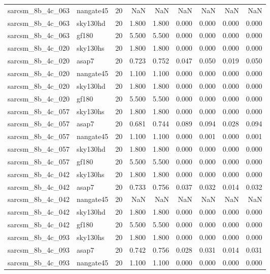 \begin{tabular}{llrrrrrrr}
sarcsm\_8b\_4c\_063 & nangate45 & 20 & NaN & NaN & NaN & NaN & NaN & NaN \\
sarcsm\_8b\_4c\_063 & sky130hd & 20 & 1.800 & 1.800 & 0.000 & 0.000 & 0.000 & 0.000 \\
sarcsm\_8b\_4c\_063 & gf180 & 20 & 5.500 & 5.500 & 0.000 & 0.000 & 0.000 & 0.000 \\
sarcsm\_8b\_4c\_020 & sky130hs & 20 & 1.800 & 1.800 & 0.000 & 0.000 & 0.000 & 0.000 \\
sarcsm\_8b\_4c\_020 & asap7 & 20 & 0.723 & 0.752 & 0.047 & 0.050 & 0.019 & 0.050 \\
sarcsm\_8b\_4c\_020 & nangate45 & 20 & 1.100 & 1.100 & 0.000 & 0.000 & 0.000 & 0.000 \\
sarcsm\_8b\_4c\_020 & sky130hd & 20 & 1.800 & 1.800 & 0.000 & 0.000 & 0.000 & 0.000 \\
sarcsm\_8b\_4c\_020 & gf180 & 20 & 5.500 & 5.500 & 0.000 & 0.000 & 0.000 & 0.000 \\
sarcsm\_8b\_4c\_057 & sky130hs & 20 & 1.800 & 1.800 & 0.000 & 0.000 & 0.000 & 0.000 \\
sarcsm\_8b\_4c\_057 & asap7 & 20 & 0.681 & 0.744 & 0.089 & 0.094 & 0.028 & 0.094 \\
sarcsm\_8b\_4c\_057 & nangate45 & 20 & 1.100 & 1.100 & 0.000 & 0.001 & 0.000 & 0.001 \\
sarcsm\_8b\_4c\_057 & sky130hd & 20 & 1.800 & 1.800 & 0.000 & 0.000 & 0.000 & 0.000 \\
sarcsm\_8b\_4c\_057 & gf180 & 20 & 5.500 & 5.500 & 0.000 & 0.000 & 0.000 & 0.000 \\
sarcsm\_8b\_4c\_042 & sky130hs & 20 & 1.800 & 1.800 & 0.000 & 0.000 & 0.000 & 0.000 \\
sarcsm\_8b\_4c\_042 & asap7 & 20 & 0.733 & 0.756 & 0.037 & 0.032 & 0.014 & 0.032 \\
sarcsm\_8b\_4c\_042 & nangate45 & 20 & NaN & NaN & NaN & NaN & NaN & NaN \\
sarcsm\_8b\_4c\_042 & sky130hd & 20 & 1.800 & 1.800 & 0.000 & 0.000 & 0.000 & 0.000 \\
sarcsm\_8b\_4c\_042 & gf180 & 20 & 5.500 & 5.500 & 0.000 & 0.000 & 0.000 & 0.000 \\
sarcsm\_8b\_4c\_093 & sky130hs & 20 & 1.800 & 1.800 & 0.000 & 0.000 & 0.000 & 0.000 \\
sarcsm\_8b\_4c\_093 & asap7 & 20 & 0.742 & 0.756 & 0.028 & 0.031 & 0.014 & 0.031 \\
sarcsm\_8b\_4c\_093 & nangate45 & 20 & 1.100 & 1.100 & 0.000 & 0.000 & 0.000 & 0.000 \\

\end{tabular}
